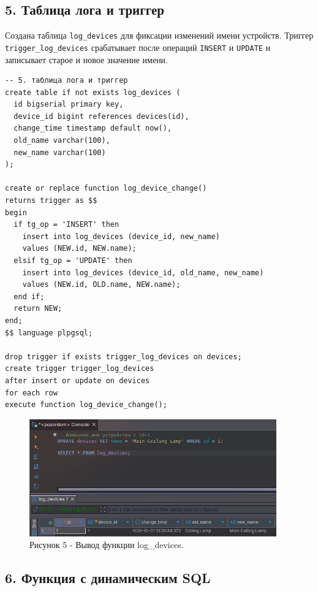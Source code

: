 \documentclass[oneside,a4paper,14pt]{extarticle}
\begin{document}
\subsection*{5. Таблица лога и триггер}

Создана таблица \texttt{log\_devices} для фиксации изменений имени устройств. Триггер \texttt{trigger\_log\_devices} срабатывает после операций \texttt{INSERT} и \texttt{UPDATE} и записывает старое и новое значение имени.

\begin{verbatim}
-- 5. таблица лога и триггер
create table if not exists log_devices (
  id bigserial primary key,
  device_id bigint references devices(id),
  change_time timestamp default now(),
  old_name varchar(100),
  new_name varchar(100)
);

create or replace function log_device_change()
returns trigger as $$
begin
  if tg_op = 'INSERT' then
    insert into log_devices (device_id, new_name)
    values (NEW.id, NEW.name);
  elsif tg_op = 'UPDATE' then
    insert into log_devices (device_id, old_name, new_name)
    values (NEW.id, OLD.name, NEW.name);
  end if;
  return NEW;
end;
$$ language plpgsql;

drop trigger if exists trigger_log_devices on devices;
create trigger trigger_log_devices
after insert or update on devices
for each row
execute function log_device_change();
\end{verbatim}

\begin{figure}[H]
  \centering
  \includegraphics[width=0.95\textwidth]{pics/log_devices.png}
  \caption*{Рисунок 5 - Вывод функции log\_devices.}
\end{figure}

\subsection*{6. Функция с динамическим SQL}
\end{document}
